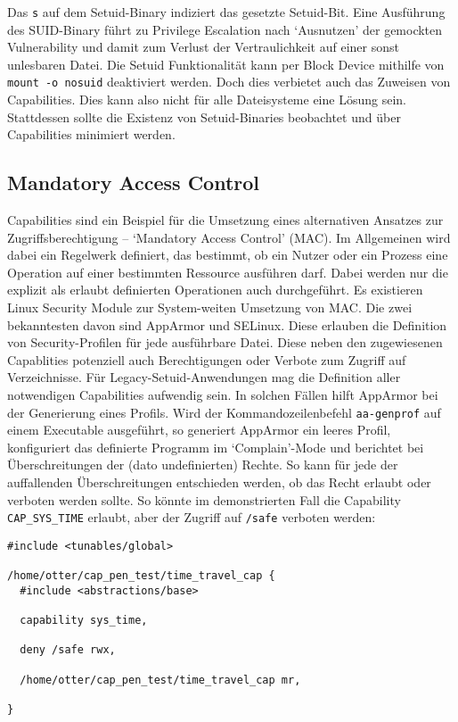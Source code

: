 Das \texttt{s} auf dem Setuid-Binary indiziert das gesetzte Setuid-Bit. Eine Ausführung des SUID-Binary führt zu Privilege Escalation nach `Ausnutzen' der gemockten Vulnerability und damit zum Verlust der Vertraulichkeit auf einer sonst unlesbaren Datei. Die Setuid Funktionalität kann per Block Device mithilfe von \texttt{mount -o nosuid} deaktiviert werden. Doch dies verbietet auch das Zuweisen von Capabilities. Dies kann also nicht für alle Dateisysteme eine Lösung sein. Stattdessen sollte
die Existenz von Setuid-Binaries beobachtet und über Capabilities minimiert werden.

\subsection{Mandatory Access Control}

Capabilities sind ein Beispiel für die Umsetzung eines alternativen Ansatzes zur Zugriffsberechtigung -- `Mandatory Access Control' (MAC). Im Allgemeinen wird dabei ein Regelwerk definiert, das bestimmt, ob ein Nutzer oder ein Prozess eine Operation auf einer bestimmten Ressource ausführen darf. Dabei werden nur die explizit als erlaubt definierten Operationen auch durchgeführt. Es existieren Linux Security Module zur System-weiten Umsetzung von MAC. Die zwei bekanntesten davon
sind AppArmor und SELinux. Diese erlauben die Definition von Security-Profilen für jede ausführbare Datei. Diese neben den zugewiesenen Capablities potenziell auch Berechtigungen oder Verbote zum Zugriff auf Verzeichnisse. Für Legacy-Setuid-Anwendungen mag die Definition aller notwendigen Capabilities aufwendig sein. In solchen Fällen hilft AppArmor bei der Generierung eines Profils. Wird der Kommandozeilenbefehl \texttt{aa-genprof} auf einem Executable ausgeführt, so generiert
AppArmor ein leeres Profil, konfiguriert das definierte Programm im `Complain'-Mode und berichtet bei Überschreitungen der (dato undefinierten) Rechte. So kann für jede der auffallenden Überschreitungen entschieden werden, ob das Recht erlaubt oder verboten werden sollte. So könnte im demonstrierten Fall die Capability \texttt{CAP\_SYS\_TIME} erlaubt, aber der Zugriff auf \texttt{/safe} verboten werden:

\begin{lstlisting}
#include <tunables/global>

/home/otter/cap_pen_test/time_travel_cap {
  #include <abstractions/base>

  capability sys_time,

  deny /safe rwx,

  /home/otter/cap_pen_test/time_travel_cap mr,

}
\end{lstlisting}

